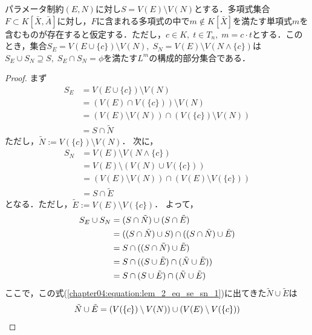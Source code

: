 \begin{lemma}
	\label{chapter04:lemma:for_alg_2}
	パラメータ制約$(E, N)$に対し$S = V(E) \setminus V(N)$とする．多項式集合$F \subset K[\bar{X}, \bar{A}]$に対し，$F$に含まれる多項式の中で$m \notin K[\bar{X}]$を満たす単項式$m$を含むものが存在すると仮定する．ただし，$c \in K,\; t \in T_n, \; m = c \cdot t$とする．このとき，集合$S_E = V(E \cup \{ c \}) \setminus V(N), \; S_N = V(E) \setminus V(N \land \{ c \})$は$S_E \cup S_N \supseteq S,\; S_E \cap S_N = \phi$を満たす$L^m$の構成的部分集合である．
\end{lemma}


\begin{proof}
	まず
	\begin{align*}
		S_E &= V(E \cup \{ c \}) \setminus V(N) \\
		&= (V(E) \cap V(\{ c \})) \setminus V(N) \\
		&= \left( V(E) \setminus V(N) \right) \cap \left( V(\{ c \}) \setminus V(N) \right) \\
		&= S \cap \tilde{N}
	\end{align*}
	ただし，$\tilde{N} :=  V(\{ c \}) \setminus V(N)$．
	次に，
	\begin{align*}
		S_N &= V(E) \setminus V(N \land \{ c \}) \\
		&= V(E) \setminus ( V(N) \cup V(\{ c \}) ) \\
		&= \left( V(E) \setminus V(N) \right) \cap \left( V(E) \setminus V(\{ c \}) \right) \\
		&= S \cap \tilde{E}
	\end{align*}
	となる．ただし，$\tilde{E} := V(E) \setminus V(\{ c \})$．
	よって，
	\begin{align}
		S_E \cup S_N &= (S \cap \tilde{N}) \cup (S \cap \tilde{E}) \notag\\
		&= ((S \cap \tilde{N}) \cup S) \cap ((S \cap \tilde{N}) \cup \tilde{E}) \notag\\
		&= S \cap ((S \cap \tilde{N}) \cup \tilde{E}) \notag\\
		&= S \cap ((S \cup \tilde{E}) \cap (\tilde{N} \cup \tilde{E})) \notag\\
		&= S \cap (S \cup \tilde{E}) \cap (\tilde{N} \cup \tilde{E}) \label{chapter04:equation:lem_2_eq_se_sn_1}
	\end{align}
	ここで，この式(\ref{chapter04:equation:lem_2_eq_se_sn_1})に出てきた$\tilde{N} \cup \tilde{E}$は
	\begin{align}
		\tilde{N} \cup \tilde{E} &= (V(\{ c \}) \setminus V(N)) \cup (V(E) \setminus V(\{ c \})) \notag \\

\end{align}
\end{proof}
